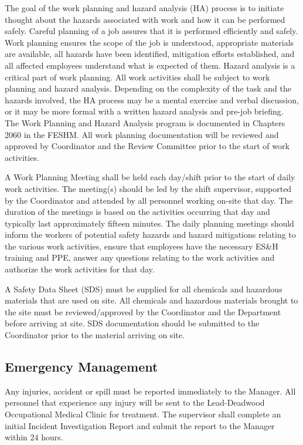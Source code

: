 The goal of the work planning and hazard analysis (HA) process is to
initiate thought about the hazards associated with work and how it can
be performed safely. Careful planning of a job assures that it is
performed efficiently and safely. Work planning ensures the scope of
the job is understood, appropriate materials are available, all
hazards have been identified, mitigation efforts established, and all
affected employees understand what is expected of them. Hazard
analysis is a critical part of work planning. All work activities
shall be subject to work planning and hazard analysis. Depending on
the complexity of the task and the hazards involved, the HA process
may be a mental exercise and verbal discussion, or it may be more
formal with a written hazard analysis and pre-job briefing. The Work
Planning and Hazard Analysis program is documented in Chapters 2060 in
the FESHM. All work planning documentation will be reviewed and
approved by   Coordinator and the 
 Review Committee prior to the start of work activities.

A Work Planning Meeting shall be held each day/shift prior to the
start of daily work activities. The meeting(s) should be led by the
shift supervisor, supported by the   Coordinator and
attended by all personnel working on-site that day. The duration of
the meetings is based on the activities occurring that day and
typically last approximately fifteen minutes. The daily planning
meetings should inform the workers of potential safety hazards and
hazard mitigations relating to the various work activities, ensure
that employees have the necessary ES\&H training and PPE, answer any
questions relating to the work activities and authorize the work
activities for that day.

A Safety Data Sheet (SDS) must be supplied for all chemicals and
hazardous materials that are used on site. All chemicals and hazardous
materials brought to the \surf site must be reviewed/approved by the
  Coordinator and the \surf {}
Department before arriving at site.  SDS documentation should be
submitted to the   Coordinator prior to the
material arriving on site.

\subsection{Emergency Management}

Any injuries, accident or spill must be reported immediately to the 
 Manager. All personnel that experience any injury will be sent to
the Lead-Deadwood Occupational Medical Clinic for treatment. The
supervisor shall complete an initial Incident Investigation Report and
submit the report to the   Manager within 24 hours.

